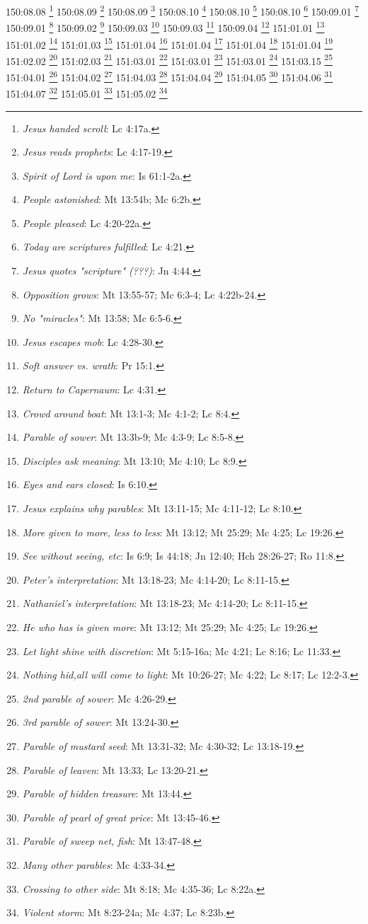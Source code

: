 150:08.08 \footnote{\textit{Jesus handed scroll}: Lc 4:17a.}
150:08.09 \footnote{\textit{Jesus reads prophets}: Lc 4:17-19.}
150:08.09 \footnote{\textit{Spirit of Lord is upon me}: Is 61:1-2a.}
150:08.10 \footnote{\textit{People astonished}: Mt 13:54b; Mc 6:2b.}
150:08.10 \footnote{\textit{People pleased}: Lc 4:20-22a.}
150:08.10 \footnote{\textit{Today are scriptures fulfilled}: Lc 4:21.}
150:09.01 \footnote{\textit{Jesus quotes "scripture" (???)}: Jn 4:44.}
150:09.01 \footnote{\textit{Opposition grows}: Mt 13:55-57; Mc 6:3-4; Lc 4:22b-24.}
150:09.02 \footnote{\textit{No "miracles"}: Mt 13:58; Mc 6:5-6.}
150:09.03 \footnote{\textit{Jesus escapes mob}: Lc 4:28-30.}
150:09.03 \footnote{\textit{Soft answer vs. wrath}: Pr 15:1.}
150:09.04 \footnote{\textit{Return to Capernaum}: Lc 4:31.}
151:01.01 \footnote{\textit{Crowd around boat}: Mt 13:1-3; Mc 4:1-2; Lc 8:4.}
151:01.02 \footnote{\textit{Parable of sower}: Mt 13:3b-9; Mc 4:3-9; Lc 8:5-8.}
151:01.03 \footnote{\textit{Disciples ask meaning}: Mt 13:10; Mc 4:10; Lc 8:9.}
151:01.04 \footnote{\textit{Eyes and ears closed}: Is 6:10.}
151:01.04 \footnote{\textit{Jesus explains why parables}: Mt 13:11-15; Mc 4:11-12; Lc 8:10.}
151:01.04 \footnote{\textit{More given to more, less to less}: Mt 13:12; Mt 25:29; Mc 4:25; Lc 19:26.}
151:01.04 \footnote{\textit{See without seeing, etc}: Is 6:9; Is 44:18; Jn 12:40; Hch 28:26-27; Ro 11:8.}
151:02.02 \footnote{\textit{Peter's interpretation}: Mt 13:18-23; Mc 4:14-20; Lc 8:11-15.}
151:02.03 \footnote{\textit{Nathaniel's interpretation}: Mt 13:18-23; Mc 4:14-20; Lc 8:11-15.}
151:03.01 \footnote{\textit{He who has is given more}: Mt 13:12; Mt 25:29; Mc 4:25; Lc 19:26.}
151:03.01 \footnote{\textit{Let light shine with discretion}: Mt 5:15-16a; Mc 4:21; Lc 8:16; Lc 11:33.}
151:03.01 \footnote{\textit{Nothing hid,all will come to light}: Mt 10:26-27; Mc 4:22; Lc 8:17; Lc 12:2-3.}
151:03.15 \footnote{\textit{2nd parable of sower}: Mc 4:26-29.}
151:04.01 \footnote{\textit{3rd parable of sower}: Mt 13:24-30.}
151:04.02 \footnote{\textit{Parable of mustard seed}: Mt 13:31-32; Mc 4:30-32; Lc 13:18-19.}
151:04.03 \footnote{\textit{Parable of leaven}: Mt 13:33; Lc 13:20-21.}
151:04.04 \footnote{\textit{Parable of hidden treasure}: Mt 13:44.}
151:04.05 \footnote{\textit{Parable of pearl of great price}: Mt 13:45-46.}
151:04.06 \footnote{\textit{Parable of sweep net, fish}: Mt 13:47-48.}
151:04.07 \footnote{\textit{Many other parables}: Mc 4:33-34.}
151:05.01 \footnote{\textit{Crossing to other side}: Mt 8:18; Mc 4:35-36; Lc 8:22a.}
151:05.02 \footnote{\textit{Violent storm}: Mt 8:23-24a; Mc 4:37; Lc 8:23b.}
